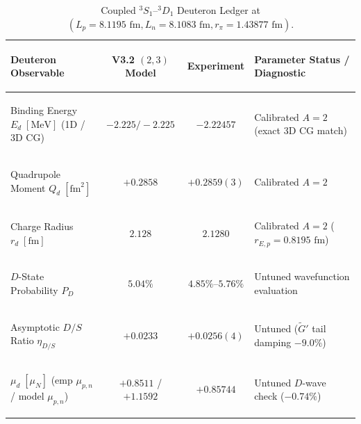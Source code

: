 \documentclass[11pt, a4paper]{article}
\begin{document}
\begin{table}[!htbp]
\centering
\caption{Coupled $^3S_1\text{--}{}^3D_1$ Deuteron Ledger at $(L_p = 8.1195\text{ fm}, L_n = 8.1083\text{ fm}, r_\pi = 1.43877\text{ fm})$.}
\label{tab:deuteron_coupled}
\footnotesize
\setlength{\tabcolsep}{5pt}
\renewcommand{\arraystretch}{1.18}
\begin{tabularx}{\textwidth}{>{\bfseries\raggedright\arraybackslash}p{} c c >{\raggedright\arraybackslash}X}
\toprule
Deuteron Observable & V3.2 $(2,3)$ Model & Experiment & Parameter Status / Diagnostic \\
\midrule
Binding Energy $E_d\;[\text{MeV}]$ (1D / 3D CG) & $\mathbf{-2.225 / -2.225}$ & $-2.22457$ & Calibrated $A = 2$ (exact 3D CG match) \\
Quadrupole Moment $Q_d\;[\text{fm}^2]$ & $+0.2858$ & $+0.2859(3)$ & Calibrated $A = 2$ \\
Charge Radius $r_d\;[\text{fm}]$ & $2.128$ & $2.1280$ & Calibrated $A = 2$ ($r_{E,p} = 0.8195\text{ fm}$) \\
$D$-State Probability $P_D$ & $\mathbf{5.04\%}$ & $4.85\%\text{--}5.76\%$ & Untuned wavefunction evaluation \\
Asymptotic $D/S$ Ratio $\eta_{D/S}$ & $+0.0233$ & $+0.0256(4)$ & Untuned ($\widetilde{G}'$ tail damping $-9.0\%$) \\
$\mu_d\;[\mu_N]$ (emp $\mu_{p,n}$ / model $\mu_{p,n}$) & $\mathbf{+0.8511}$ / $+1.1592$ & $+0.85744$ & Untuned $D$-wave check ($-0.74\%$) \\
\bottomrule
\end{tabularx}
\end{table}
\end{document}
